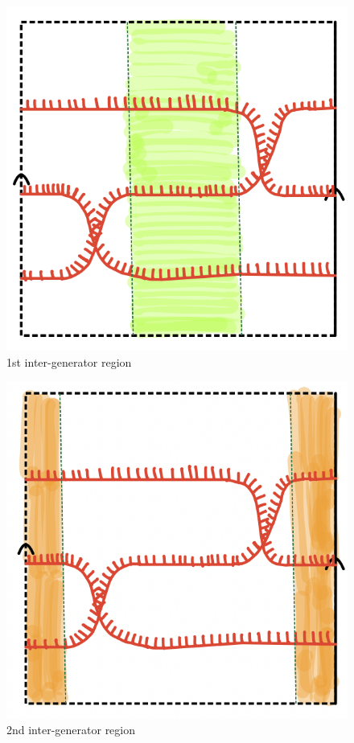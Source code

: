 \begin{figure}[H] %
    \centering
    \includegraphics[scale = 0.95]{diagrams/natural_alternating_diagrams/7-1.png} %
    \caption{1st inter-generator region}
    \label{fig:your-label}
\end{figure}

\begin{figure}[H] %
    \centering
    \includegraphics[scale = 0.95]{diagrams/natural_alternating_diagrams/7-2.png} %
    \caption{2nd inter-generator region}
    \label{fig:your-label}
\end{figure}

